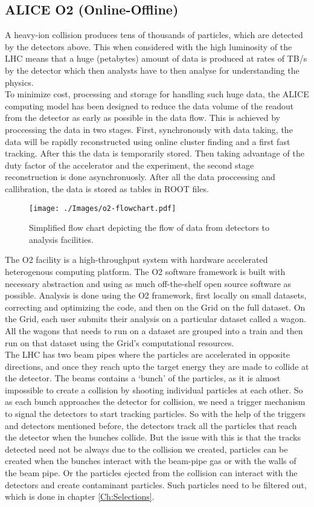 \documentclass[12pt,a4paper,twoside]{report}
\begin{document}
\subsection{ALICE O2 (Online-Offline)}
A heavy-ion collision produces tens of thousands of particles, which are detected by the detectors above. This when considered with the high luminosity of the LHC means that a huge (petabytes) amount of data is produced at rates of TB/s by the detector which then analysts have to then analyse for understanding the physics.\\

To minimize cost, processing and storage for handling such huge data, the ALICE computing model has been designed to reduce the data volume of the readout from the detector as early as possible in the data flow. This is achieved by proccessing the data in two stages. First, synchronously with data taking, the data will be rapidly reconstructed using online cluster finding and a first fast tracking. After this the data is temporarily stored. Then taking advantage of the duty factor of the accelerator and the experiment, the second stage reconstruction is done asynchronuosly. After all the data proccessing and callibration, the data is stored as tables in ROOT files.\\
\begin{figure}[H]
	\centering
	\texttt{[image: ./Images/o2-flowchart.pdf]}
	\caption{Simplified flow chart depicting the flow of data from detectors to analysis facilities.}
\end{figure}
The O2 facility is a high-throughput system with hardware accelerated heterogenous computing platform. The O2 software framework is built with necessary abstraction and using as much off-the-shelf open source software as possible. Analysis is done using the O2 framework, first locally on small datasets, correcting and optimizing the code, and then on the Grid on the full dataset. On the Grid, each user submits their analysis on a particular dataset called a wagon. All the wagons that needs to run on a dataset are grouped into a train and then run on that dataset using the Grid's computational resources. \cite{Ref:O2-TDR}\\

The LHC has two beam pipes where the particles are accelerated in opposite directions, and once they reach upto the target energy they are made to collide at the detector. The beams contains a `bunch' of the particles, as it is almost impossible to create a collision by shooting individual particles at each other. So as each bunch approaches the detector for collision, we need a trigger mechanism to signal the detectors to start tracking particles. So with the help  of the triggers and detectors mentioned before, the detectors track all the particles that reach the detector when the bunches collide. But the issue with this is that the tracks detected need not be always due to the collision we created, particles can be created when the bunches interact with the beam-pipe gas or with the walls of the beam pipe. Or the particles ejected from the collision can interact with the detectors and create contaminant particles. Such particles need to be filtered out, which is done in chapter \ref{Ch:Selections}.
\end{document}
